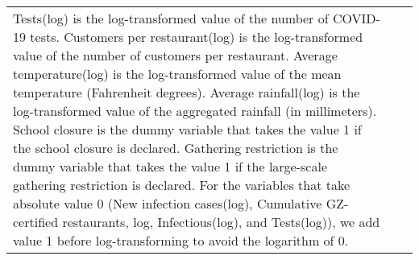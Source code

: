 \begin{table}[!htbp]
\begin{tabular}{@{\extracolsep{1pt}}lcc}
{{Tests(log) is the log-transformed value of the number of COVID-19 tests.
Customers per restaurant(log) is the log-transformed value of the number of customers per restaurant.
Average temperature(log) is the log-transformed value of the mean temperature (Fahrenheit degrees).
Average rainfall(log) is the log-transformed value of the aggregated rainfall (in millimeters).
School closure is the dummy variable that takes the value 1 if the school closure is declared. 
Gathering restriction is the dummy variable that takes the value 1 if the large-scale gathering restriction is declared.
For the variables that take absolute value 0 (New infection cases(log), Cumulative GZ-certified restaurants, log, Infectious(log), and Tests(log)), we add value 1 before log-transforming to avoid the logarithm of 0.}} \\
\end{tabular} 
\end{table} 
